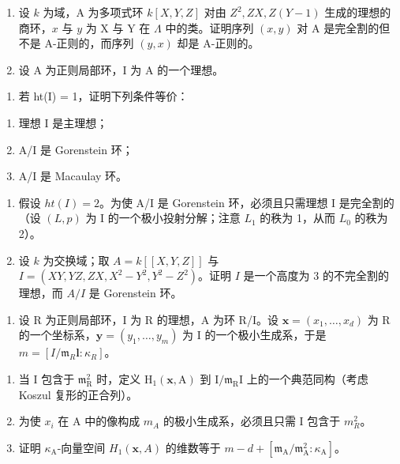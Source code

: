 
\begin{enumerate}
\def\labelenumi{\arabic{enumi})}
\item
  设 \(k\) 为域，A 为多项式环 \(k[X,Y,Z]\) 对由 \(Z^2,ZX,Z(Y-1)\) 生成的理想的商环，\(x\) 与 \(y\) 为 X 与 Y 在 \(\Lambda\) 中的类。证明序列 \((x,y)\) 对 A 是完全割的但不是 A-正则的，而序列 \((y,x)\) 却是 A-正则的。
\item
  设 A 为正则局部环，I 为 A 的一个理想。
\end{enumerate}

\begin{enumerate}
\def\labelenumi{\alph{enumi})}
\tightlist
\item
  若 ht(I) = 1，证明下列条件等价：
\end{enumerate}

\begin{enumerate}
\def\labelenumi{(\roman{enumi})}
\item
  理想 I 是主理想；
\item
  A/I 是 Gorenstein 环；
\item
  A/I 是 Macaulay 环。
\end{enumerate}

\begin{enumerate}
\def\labelenumi{\alph{enumi})}
\setcounter{enumi}{1}
\item
  假设 \(ht(I)=2\)。为使 A/I 是 Gorenstein 环，必须且只需理想 I 是完全割的（设 \((L,p)\) 为 I 的一个极小投射分解；注意 \(L_{1}\) 的秩为 1，从而 \(L_{0}\) 的秩为 2）。
\item
  设 \(k\) 为交换域；取 \(A = k[[X,Y,Z]]\) 与 \(I = (XY,YZ,ZX, X^2 - Y^2, Y^2 - Z^2)\)。证明 \(I\) 是一个高度为 3 的不完全割的理想，而 \(A/I\) 是 Gorenstein 环。
\end{enumerate}

\begin{enumerate}
\def\labelenumi{\arabic{enumi})}
\setcounter{enumi}{2}
\tightlist
\item
  设 R 为正则局部环，I 为 R 的理想，A 为环 R/I。设 \(\mathbf{x} = (x_{1}, \ldots, x_{d})\) 为 R 的一个坐标系，\(\mathbf{y} = (y_{1}, \ldots, y_{m})\) 为 I 的一个极小生成系，于是 \(m = [I/\mathfrak{m}_{R}\mathbf{l} : \kappa_{R}]\)。
\end{enumerate}

\begin{enumerate}
\def\labelenumi{\alph{enumi})}
\item
  当 I 包含于 \(\mathfrak{m}_{\mathrm{R}}^{2}\) 时，定义 \(\mathrm{H}_1(\mathbf{x},\mathrm{A})\) 到 \(\mathrm{I} / \mathfrak{m}_{\mathrm{R}}\mathrm{I}\) 上的一个典范同构（考虑 Koszul 复形的正合列）。
\item
  为使 \(x_{i}\) 在 A 中的像构成 \(m_{A}\) 的极小生成系，必须且只需 I 包含于 \(m_{R}^{2}\)。
\item
  证明 \(\kappa_{\mathrm{A}}\)-向量空间 \(H_1(\mathbf{x}, A)\) 的维数等于 \(m - d + [\mathfrak{m}_{\mathrm{A}} / \mathfrak{m}_{\mathrm{A}}^{2} : \kappa_{\mathrm{A}}]\)。
\end{enumerate}

